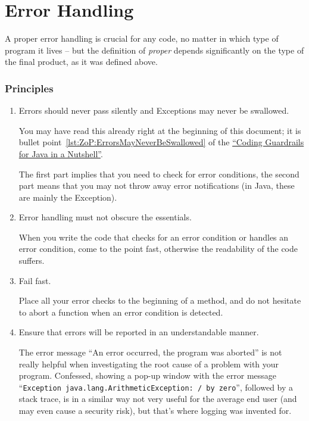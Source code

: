 \documentclass[11pt,a4paper, titlepage, parskip=half, headsepline, footsepline, cleardoublepage=current, headheight=1cm]{scrbook}
\newcommand*{\ngref}{\hyperref[lst:NutshellGuardrails]{“Coding Guardrails for Java in a Nutshell”}}
\begin{document}

\section{Error Handling}\label{sec:ErrorHandling}
A proper error handling is crucial for any code, no matter in which type of program it lives – but the definition of \textit{proper} depends significantly on the type of the final product, as it was defined above.

\subsubsection{Principles}
\begin{enumerate}[label=P\arabic*.]
\item{Errors should never pass silently and Exceptions may never be swallowed.

You may have read this already right at the beginning of this document; it is bullet point~\ref{lst:ZoP:ErrorsMayNeverBeSwallowed} of the \ngref.

The first part implies that you need to check for error conditions, the second part means that you may not throw away error notifications (in Java, these are mainly the Exception).}

\item{Error handling must not obscure the essentials.

When you write the code that checks for an error condition or handles an error condition, come to the point fast, otherwise the readability of the code suffers.}

\item{Fail fast.

Place all your error checks to the beginning of a method, and do not hesitate to abort a function when an error condition is detected.}

\item{Ensure that errors will be reported in an understandable manner.

The error message “An error occurred, the program was aborted” is not really helpful when investigating the root cause of a problem with your program. Confessed, showing a pop-up window with the error message “\verb#Exception java.lang.ArithmeticException: / by zero#”, followed by a stack trace, is in a similar way not very useful for the average end user (and may even cause a security risk), but that's where logging was invented for.}
\end{enumerate}
\end{document}

